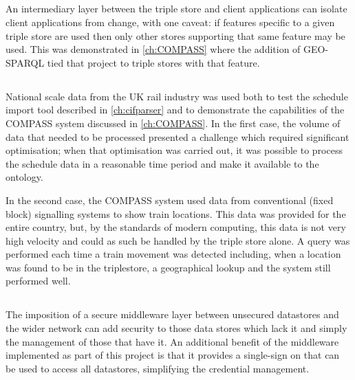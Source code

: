 \subsection{\QuestionChange}
An intermediary layer between the triple store and client applications can isolate client applications from change, with one caveat: if features specific to a given triple store are used then only other stores supporting that same feature may be used. This was demonstrated in \autoref{ch:COMPASS} where the addition of GEO-SPARQL tied that project to triple stores with that feature.

\subsection{\QuestionCanOntologyScale}
National scale data from the UK rail industry was used both to test the schedule import tool described in \autoref{ch:cifparser} and to demonstrate the capabilities of the COMPASS system discussed in \autoref{ch:COMPASS}. In the first case, the volume of data that needed to be processed presented a challenge which required significant optimisation; when that optimisation was carried out, it was possible to process the schedule data in a reasonable time period and make it available to the ontology. 

In the second case, the COMPASS system used data from conventional (fixed block) signalling systems to show train locations. This data was provided for the entire country, but, by the standards of modern computing, this data is not very high velocity and could as such be handled by the triple store alone. A query was performed each time a train movement was detected including, when a location was found to be in the triplestore, a geographical lookup and the system still performed well.

\subsection{\QuestionSecurity}
The imposition of a secure middleware layer between unsecured datastores and the wider network can add security to those data stores which lack it and simply the management of those that have it. An additional benefit of the middleware implemented as part of this project is that it provides a single-sign on that can be used to access all datastores, simplifying the credential management.